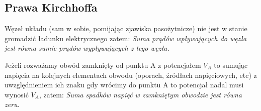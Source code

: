 \subsection{Prawa Kirchhoffa}
Węzeł układu (sam w sobie, pomijając zjawiska pasożytnicze) nie jest w stanie gromadzić ładunku elektrycznego zatem: \emph{Suma prądów wpływających do węzła jest równa sumie prądów wypływających z tego węzła.}

Jeżeli rozważamy obwód zamknięty od punktu A z potencjałem $V_A$ to sumując napięcia na kolejnych elementach obwodu (oporach, źródłach napięciowych, etc) z uwzględnieniem ich znaku gdy wrócimy do punktu A to potencjał nadal musi wynosić $V_A$, zatem: \emph{Suma spadków napięć w zamkniętym obwodzie jest równa zeru.}
